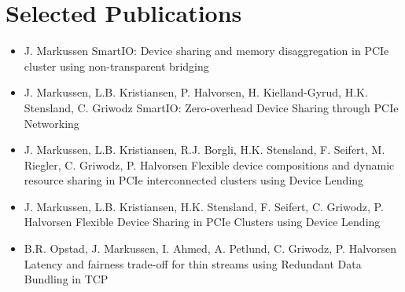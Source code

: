 \section{Selected Publications}
\begin{itemize}
    \item {}
        {J. Markussen}
        {SmartIO: Device sharing and memory disaggregation in PCIe cluster using non-transparent bridging}

    \item {}
		{J. Markussen, L.B. Kristiansen, P. Halvorsen, H. Kielland-Gyrud, H.K. Stensland, C. Griwodz}
		{SmartIO: Zero-overhead Device Sharing through PCIe Networking}

    \item {}
		{J. Markussen, L.B. Kristiansen, R.J. Borgli, H.K. Stensland, F. Seifert, M. Riegler, C. Griwodz, P. Halvorsen}
		{Flexible device compositions and dynamic resource sharing in PCIe interconnected clusters using Device Lending}
	
	\item {}
		{J. Markussen, L.B. Kristiansen, H.K. Stensland, F. Seifert, C. Griwodz, P. Halvorsen}
		{Flexible Device Sharing in PCIe Clusters using Device Lending}


    \item {}
		{B.R. Opstad, J. Markussen, I. Ahmed, A. Petlund, C. Griwodz, P. Halvorsen}
		{Latency and fairness trade-off for thin streams using Redundant Data Bundling in TCP}
\end{itemize}
